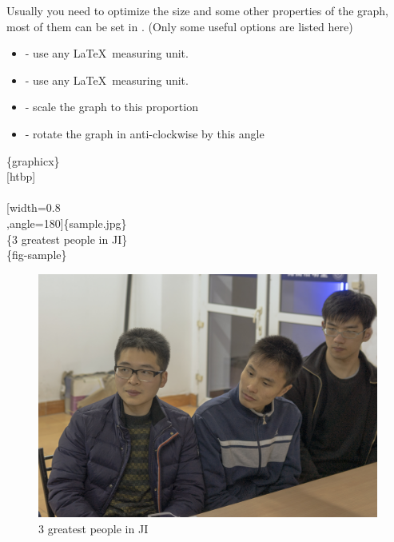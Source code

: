 \begin{frame}
	Usually you need to optimize the size and some other properties of the graph, most of them can be set in . (Only some useful options are listed here)
	\begin{itemize}
		\item {} - use any \LaTeX\ measuring unit.
		\item {} - use any \LaTeX\ measuring unit.
		\item {} - scale the graph to this proportion
		\item {} - rotate the graph in anti-clockwise by this angle 
	\end{itemize}
	\begin{minipage}{0.5\linewidth}
		\begin{example}
			\{graphicx\}\\
			[htbp]\\
			\qquad {}\\
			\qquad {}[width=0.8\\
			,angle=180]\{sample.jpg\}\\
			\qquad {}\{3 greatest people in JI\}\\
			\qquad {}\{fig-sample\}\\
		\end{example}
	\end{minipage}
	\hfill
	\begin{minipage}{0.45\linewidth}
		\begin{figure}[htbp]
			\centering
			\includegraphics[width=0.8\linewidth,angle=180]{img/sample.jpg}
			\caption{3 greatest people in JI}
			\label{fig-sample}		
		\end{figure}
	\end{minipage}
\end{frame}

